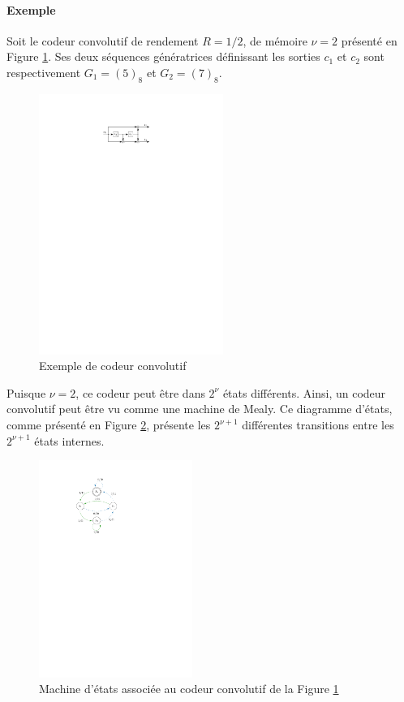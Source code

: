 \paragraph*{Exemple}
Soit le codeur convolutif de rendement $R=1/2$, de mémoire $\nu = 2$ présenté en Figure \ref{fig:encConv}. Ses deux 
séquences génératrices définissant les sorties $c_1$ et $c_2$ sont respectivement $G_1 = (5)_8$ et $G_2 = (7)_8$.
\begin{figure}[!h]
	\centering
	\includegraphics[width=6cm]{main/ch1_fig/encConv.pdf}
	\caption{\label{fig:encConv} Exemple de codeur convolutif}
\end{figure}
Puisque $\nu = 2$, ce codeur peut être dans $2^\nu$ états différents. Ainsi, un codeur convolutif peut être vu comme une 
machine de Mealy. Ce diagramme d'états, comme présenté en Figure \ref{fig:stateMachine}, présente les  $2^{\nu+1}$ 
différentes transitions entre les $2^{\nu+1}$ états internes. 
\begin{figure}[!h]
	\centering
	\includegraphics[width=5cm]{main/ch1_fig/stateMachine.pdf}
	\caption{\label{fig:stateMachine} Machine d'états associée au codeur convolutif de la Figure \ref{fig:encConv}}
\end{figure}

